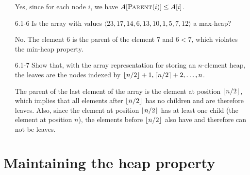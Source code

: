 \begin{enumerate}
\begin{framed}
Yes, since for each node $i$, we have $A[\textsc{Parent}(i)] \le A[i]$.
\end{framed}

\item[6.1{-}6]{Is the array with values
$\langle 23, 17, 14, 6, 13, 10, 1, 5, 7, 12 \rangle$ a max-heap?}

\begin{framed}
No. The element 6 is the parent of the element 7 and $6 < 7$, which violates the
min-heap property.
\end{framed}

\item[6.1{-}7]{Show that, with the array representation for storing an
$n$-element heap, the leaves are the nodes indexed by
$\lfloor n/2\rfloor + 1, \lceil n/2\rceil + 2, \dots, n$.}

\begin{framed}
The parent of the last element of the array is the element at position
$\lfloor n/2\rfloor$, which implies that all elements after $\lfloor n/2\rfloor$ has no
children and are therefore leaves. Also, since the element at position
$\lfloor n/2\rfloor$ has at least one child (the element at position $n$), the
elements before $\lfloor n/2\rfloor$ also have and therefore can not be leaves.
\end{framed}

\end{enumerate}

\newpage

\section{Maintaining the heap property}

